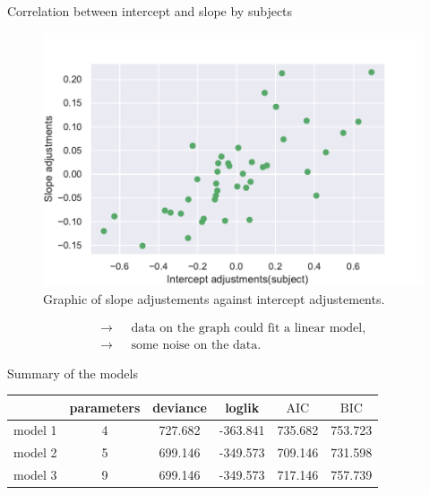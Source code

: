 \documentclass[unknownkeysallowed]{beamer}
\newcommand*{\AIC}{\mathrm{AIC}}
\newcommand*{\BIC}{\mathrm{BIC}}
\begin{document}
\begin{frame}{Correlation between intercept and slope by subjects}
    \begin{figure}[H]
    \centering
    \includegraphics[scale=.45]{./images/adj_so_inter.pdf}
    \caption{Graphic of slope adjustements against intercept adjustements.}
    \end{figure}
\vspace{-0.3cm}
\begin{align*}
    \longrightarrow \text{ }&\text{data on the graph could fit a linear model},\\
    \longrightarrow \text{ }& \text{some noise on the data}.
\end{align*}
\end{frame}

\begin{frame}{Summary of the models}
\begin{center}
    \begin{tabular}{|c|c|c|c|c|c|}
    \hline
         & parameters & deviance & loglik & $\AIC$ & $\BIC$ \\
         \hline \hline
        model 1 & 4 & 727.682 & -363.841 & 735.682 & 753.723\\
        model 2 & 5 & 699.146 & -349.573 & 709.146 & 731.598\\
        model 3 & 9 & 699.146 & -349.573 &717.146 & 757.739\\
        \hline
    \end{tabular}
\end{center}
\end{frame}
\end{document}
